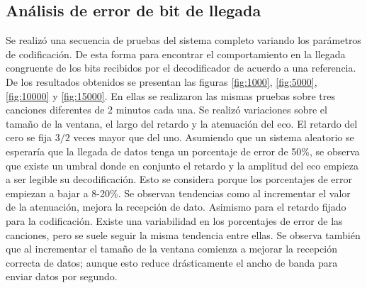 \documentclass[conference]{IEEEtran}
\begin{document}
\subsection{Análisis de error de bit de llegada}

Se realizó una secuencia de pruebas del sistema completo variando los parámetros de codificación. De esta forma para encontrar el comportamiento en la llegada congruente de los bits recibidos por el decodificador de acuerdo a una referencia. De los resultados obtenidos se presentan las figuras \ref{fig:1000}, \ref{fig:5000}, \ref{fig:10000} y \ref{fig:15000}. En ellas se realizaron las mismas pruebas sobre tres canciones diferentes de 2 minutos cada una. Se realizó variaciones sobre el tamaño de la ventana, el largo del retardo y la atenuación del eco. El retardo del cero se fija $3/2$ veces mayor que del uno. Asumiendo que un sistema aleatorio se esperaría que la llegada de datos tenga un porcentaje de error de 50\%, se observa que existe un umbral donde en conjunto el retardo y la amplitud del eco empieza a ser legible su decodificación. Esto se considera porque los porcentajes de error empiezan a bajar a 8-20\%. Se observan tendencias como al incrementar el valor de la atenuación, mejora la recepción de dato. Asimismo para el retardo fijado para la codificación. Existe una variabilidad en los porcentajes de error de las canciones, pero se suele seguir la misma tendencia entre ellas. Se observa también que al incrementar el tamaño de la ventana comienza a mejorar la recepción correcta de datos; aunque esto reduce drásticamente el ancho de banda para enviar datos por segundo.
\end{document}
